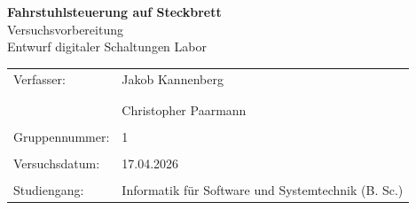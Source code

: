 \documentclass[a4paper,12pt,bibtotocnumbered]{scrartcl} %
\numberwithin{equation}{section} %
\begin{document}


\thispagestyle{empty} %
\begin{titlepage}
	\begin{center}
		\Huge{\textbf{Fahrstuhlsteuerung auf Steckbrett}}\\ %
		\vspace{10mm}%
		\Large{Versuchsvorbereitung} \\
		\vspace{5mm}
		\Large{Entwurf digitaler Schaltungen Labor}\\
	\end{center}
	\vspace{1cm}
	\begin{center}
		\begin{tabular}{ll}
			\large{Verfasser:}     & \large{Jakob Kannenberg}                                   \\ %
			\vspace{0cm}                                                                        \\
			\vspace{0cm}                                                                        \\
			                       & \large{Christopher Paarmann}                               \\
			\vspace{0cm}                                                                        \\
			\large{Gruppennummer:} & \large{1}                                                  \\
			\vspace{0cm}                                                                        \\
			\large{Versuchsdatum:} & \large{17.04.2026}                                         \\
			\vspace{0cm}                                                                        \\
			\large{Studiengang:}   & \large{Informatik für Software und Systemtechnik (B. Sc.)}
		\end{tabular}
	\end{center}
\end{titlepage}
\end{document}
